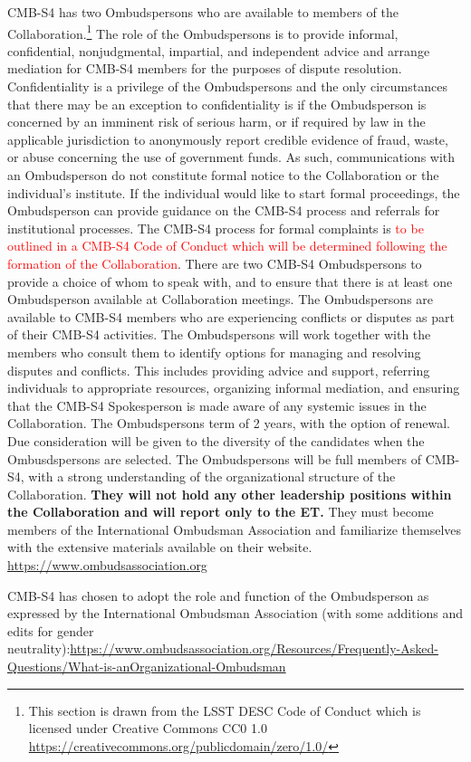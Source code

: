 \documentclass[12pt]{article}
\newcommand{\exec}{{Executive Team}}
\newcommand{\shorte}{{ET}}  %
\begin{document}
CMB-S4 has two Ombudspersons who are available to members of the Collaboration.\footnote{This section is drawn from the LSST DESC Code of Conduct which is licensed under Creative Commons CC0 1.0 \url{https://creativecommons.org/publicdomain/zero/1.0/}} The role of the Ombudspersons is to provide informal, confidential, nonjudgmental, impartial, and independent advice and arrange mediation for CMB-S4 members for the purposes of dispute resolution. Confidentiality is a privilege of the Ombudspersons and the only circumstances that there may be an exception to confidentiality is if the Ombudsperson is concerned by an imminent risk of serious harm, or if required by law in the applicable jurisdiction to anonymously report credible evidence of fraud, waste, or abuse concerning the use of government funds. As such, communications with an Ombudsperson do not constitute formal notice to the Collaboration or the individual's institute. If the individual would like to start formal proceedings, the Ombudsperson can provide guidance on the CMB-S4 process and referrals for institutional processes. The CMB-S4 process for formal complaints is  \textcolor{red}{to be outlined in a CMB-S4 Code of Conduct which will be determined following the formation of the Collaboration}. There are two CMB-S4 Ombudspersons to provide a choice of whom to speak with, and to ensure that there is at least one Ombudsperson available at Collaboration meetings. The Ombudspersons are available to CMB-S4 members who are experiencing conflicts or disputes as part of their CMB-S4 activities. The Ombudspersons will work together with the members who consult them to identify options for managing and resolving disputes and conflicts. This includes providing advice and support, referring individuals to appropriate resources, organizing informal mediation, and ensuring that the CMB-S4 Spokesperson is made aware of any systemic issues in the Collaboration. The Ombudspersons term of 2 years, with the option of renewal. Due consideration will be given to the diversity of the candidates when the Ombusdspersons are selected. The Ombudspersons will be full members of CMB-S4, with a strong understanding of the organizational structure of the Collaboration. \textbf{They will not hold any other leadership positions within the Collaboration and will report only to the \shorte.} They must become members of the International Ombudsman Association and familiarize themselves with the extensive materials available on their website. \url{https://www.ombudsassociation.org}

CMB-S4  has chosen to adopt the role and function of the Ombudsperson as expressed by the International Ombudsman Association (with some additions and edits for gender neutrality):\url{https://www.ombudsassociation.org/Resources/Frequently-Asked-Questions/What-is-anOrganizational-Ombudsman}
\end{document}
